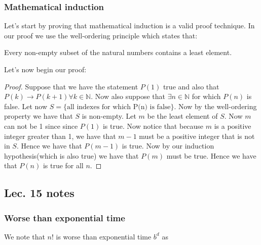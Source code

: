 \documentclass[titlepage]{article}
\theoremstyle{definition}
\numberwithin{equation}{subsection}
\numberwithin{remark}{subsection}
\begin{document}
\subsubsection{Mathematical induction}

Let's start by proving that mathematical induction is a valid proof technique.
In our proof we use the well-ordering principle which states that:

\begin{thm}
Every non-empty subset of the natural numbers contains a least element. 
\end{thm}

Let's now begin our proof:
\begin{proof}
Suppose that we have the statement $P(1)$ true and also that $P(k) \rightarrow P(k+1) \forall k \in \mathbb{N}$. Now also suppose that $\exists n \in \mathbb{N}$ for which $P(n)$ is false. Let now $S=\{\text{all indexes for which P(n) is false}\}$. Now by the well-ordering property we have that $S$ is non-empty. Let $m$ be the least element of $S$. Now $m$ can not be 1 since since $P(1)$ is true. Now notice that because $m$ is a positive integer greater than 1, we have that $m-1$ must be a positive integer that is not in $S$. Hence we have that $P(m-1)$ is true. Now by our induction hypothesis(which is also true) we have that $P(m)$ must be true. Hence we have that $P(n)$ is true for all $n$.
\end{proof}

\subsection{Lec. 15 notes}

\subsubsection{Worse than exponential time}
We note that $n!$ is worse than exponential time $b^d$ as 
\end{document}
